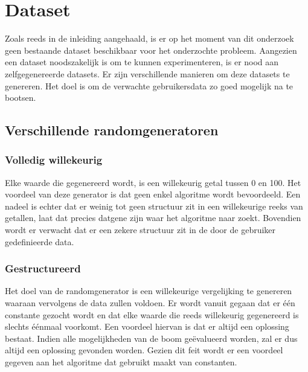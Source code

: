 \documentclass[Main.tex]{subfiles}
\begin{document}
\section{Dataset}

Zoals reeds in de inleiding aangehaald, is er op het moment van dit onderzoek geen bestaande dataset beschikbaar voor het onderzochte probleem. Aangezien een dataset noodszakelijk is om te kunnen experimenteren, is er nood aan zelfgegenereerde datasets. Er zijn verschillende manieren om deze datasets te genereren. Het doel is om de verwachte gebruikersdata zo goed mogelijk na te bootsen.
  
\subsection{Verschillende randomgeneratoren}
\subsubsection*{Volledig willekeurig}
Elke waarde die gegenereerd wordt, is een willekeurig getal tussen 0 en 100. Het voordeel van deze generator is dat geen enkel algoritme wordt bevoordeeld. Een nadeel is echter dat er weinig tot geen structuur zit in een willekeurige reeks van getallen, laat dat precies datgene zijn waar het algoritme naar zoekt. Bovendien wordt er verwacht dat er een zekere structuur zit in de door de gebruiker gedefinieerde data.

\subsubsection*{Gestructureerd}
Het doel van de randomgenerator is een willekeurige vergelijking te genereren waaraan vervolgens de data zullen voldoen. Er wordt vanuit gegaan dat er \'e\'en constante gezocht wordt en dat elke waarde die reeds willekeurig gegenereerd is slechts \'e\'enmaal voorkomt. Een voordeel hiervan is dat er altijd een oplossing bestaat. Indien alle mogelijkheden van de boom ge\"evalueerd worden, zal er dus altijd een oplossing gevonden worden. Gezien dit feit wordt er een voordeel gegeven aan het algoritme dat gebruikt maakt van constanten.
\end{document}
